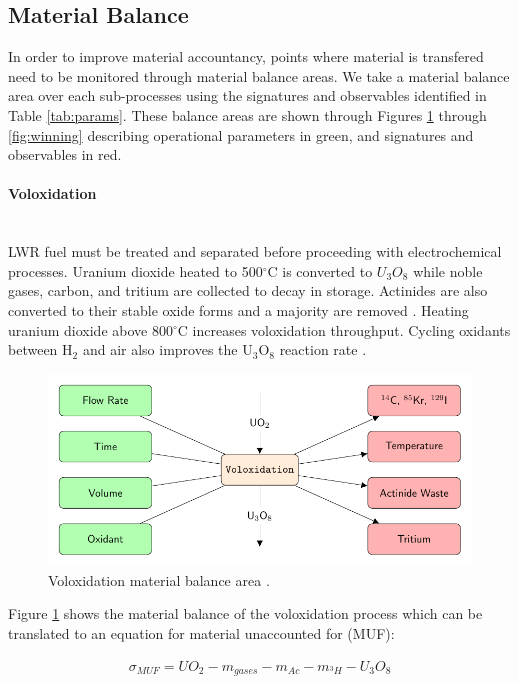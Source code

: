 \subsection{Material Balance}
In order to improve material accountancy, points where material is transfered need to be monitored through material balance areas.
We take a material balance area over each sub-processes using the signatures and observables identified in Table \ref{tab:params}. 
These balance areas are shown through Figures \ref{fig:volox} through \ref{fig:winning} describing operational parameters in green, and signatures and observables in red. 

\paragraph{Voloxidation} \mbox{}\\
\gls{LWR} fuel must be treated and separated before proceeding with electrochemical processes. Uranium dioxide heated to 
500$^{\circ}$C is converted to $U_3O_8$ while noble gases, carbon, and tritium are collected to decay in storage. 
Actinides are also converted to their stable oxide forms and a majority are removed \cite{flowsheet_1998,jubin_spent_2009}. 
Heating uranium dioxide above 800$^{\circ}$C increases voloxidation throughput.
Cycling oxidants between H$_2$ and air also improves the U$_3$O$_8$ reaction rate \cite{jubin_spent_2009}.

\begin{figure}[h]
	\centering
	\includegraphics[width=0.9\linewidth]{images/volox}
	\caption{Voloxidation material balance area \cite{jubin_spent_2009}.}
	\label{fig:volox}
\end{figure}

Figure \ref{fig:volox} shows the material balance of the voloxidation process which can be translated to an equation for material unaccounted for (MUF):

\begin{align}
\sigma_{MUF} = UO_2 - m_{gases} - m_{Ac} - m_{^3H} - U_3O_8
\end{align}

